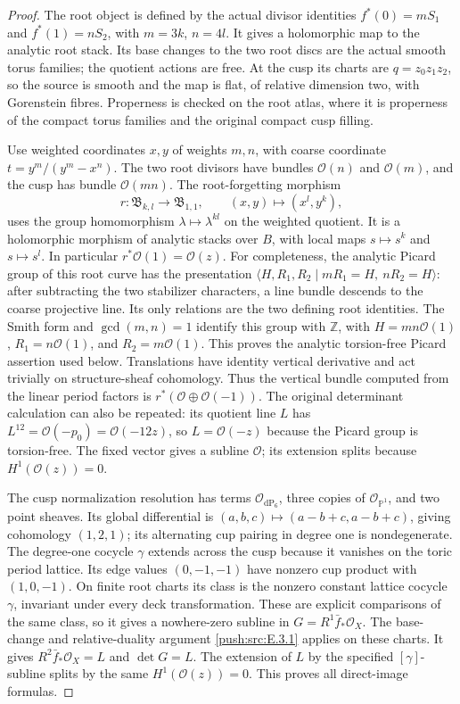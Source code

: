 \begin{proof}
The root object is defined by the actual divisor identities
$f^*(0)=mS_1$ and $f^*(1)=nS_2$, with $m=3k$, $n=4l$.
It gives a holomorphic map to the analytic root stack.  Its base
changes to the two root discs are the actual smooth torus
families; the quotient actions are free.  At the cusp its charts
are $q=z_0z_1z_2$, so the source is smooth and the map is flat,
of relative dimension two, with Gorenstein fibres.  Properness is
checked on the root atlas, where it is properness of the compact
torus families and the original compact cusp filling.

Use weighted coordinates $x,y$ of weights $m,n$, with coarse
coordinate $t=y^m/(y^m-x^n)$.
The two root divisors have bundles $\mathcal O(n)$ and
$\mathcal O(m)$, and the cusp has bundle $\mathcal O(mn)$.
The root-forgetting morphism
\[
 r:\mathfrak B_{k,l}\longrightarrow\mathfrak B_{1,1},
 \qquad (x,y)\longmapsto(x^l,y^k),
\]
uses the group homomorphism $\lambda\mapsto\lambda^{kl}$ on
the weighted quotient.  It is a holomorphic morphism of analytic
stacks over $B$, with local maps $s\mapsto s^k$ and
$s\mapsto s^l$.  In particular $r^*\mathcal O(1)=\mathcal O(z)$.
For completeness, the analytic Picard group of this root curve has
the presentation
$\langle H,R_1,R_2\mid mR_1=H,\ nR_2=H\rangle$:
after subtracting the two stabilizer characters, a line bundle
descends to the coarse projective line.  Its only relations are
the two defining root identities.  The Smith form and
$\gcd(m,n)=1$ identify this group with $\mathbb Z$, with
$H=mn\mathcal O(1)$, $R_1=n\mathcal O(1)$, and
$R_2=m\mathcal O(1)$.  This proves the analytic torsion-free
Picard assertion used below.
Translations have identity vertical derivative and act trivially
on structure-sheaf cohomology.  Thus the vertical bundle computed
from the linear period factors is $r^*(\mathcal O\oplus
\mathcal O(-1))$.  The original determinant calculation can also
be repeated: its quotient line $L$ has
$L^{12}=\mathcal O(-p_0)=\mathcal O(-12z)$, so
$L=\mathcal O(-z)$ because the Picard group is torsion-free.
The fixed vector gives a subline $\mathcal O$; its extension
splits because $H^1(\mathcal O(z))=0$.

The cusp normalization resolution has terms
$\mathcal O_{\mathrm{dP}_6}$, three copies of
$\mathcal O_{\mathbb P^1}$, and two point sheaves.
Its global differential is $(a,b,c)\mapsto
(a-b+c,a-b+c)$, giving cohomology $(1,2,1)$; its alternating cup
pairing in degree one is nondegenerate.  The degree-one cocycle
$\gamma$ extends across the cusp because it vanishes on the toric
period lattice.  Its edge values $(0,-1,-1)$ have nonzero cup
product with $(1,0,-1)$.  On finite root charts its class is the
nonzero constant lattice cocycle $\gamma$, invariant under every
deck transformation.  These are explicit comparisons of the
same class, so it gives a nowhere-zero subline in
$G=R^1\bar f_*\mathcal O_X$.
The base-change and relative-duality argument \ref{push:src:E.3.1} applies on
these charts.  It gives $R^2\bar f_*\mathcal O_X=L$ and
$\det G=L$.  The extension of $L$ by the specified
$[\gamma]$-subline splits by the same $H^1(\mathcal O(z))=0$.
This proves all direct-image formulas.


\end{proof}
